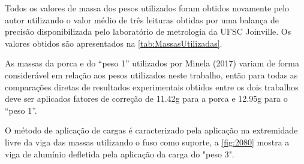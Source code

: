 Todos os valores de massa dos pesos utilizados foram obtidos novamente pelo autor utilizando o valor médio de três leituras obtidas por uma balança de precisão disponibilizada
pelo laboratório de metrologia da UFSC Joinville.
Os valores obtidos são apresentados na \autoref{tab:MassasUtilizadas}.

\begin{table}[!ht]
    \caption{Valores de massas utilizadas para aplicação das cargas nos dispositivos de flexão e torção}
    \label{tab:MassasUtilizadas}
    \centering
\end{table}

As massas da porca e do “peso 1” utilizados por Minela (2017) variam de forma considerável em relação aos pesos utilizados neste trabalho, então para todas as comparações diretas de
resultados experimentais obtidos entre os dois trabalhos deve ser aplicados fatores de correção de 11.42g para a porca e 12.95g para o “peso 1”.

O método de aplicação de cargas é caracterizado pela aplicação na extremidade livre da viga das massas utilizando o fuso como suporte, a \autoref{fig:2080} mostra a viga de alumínio defletida
pela aplicação da carga do "peso 3".

